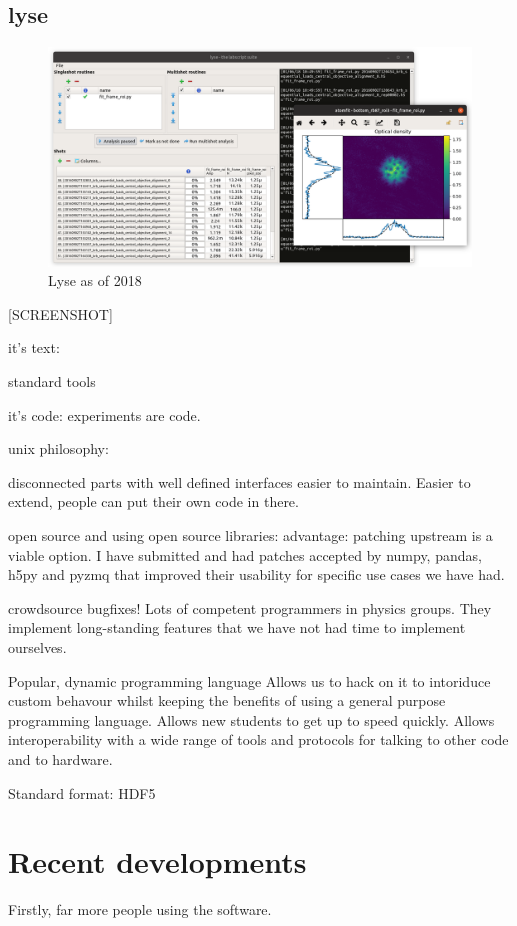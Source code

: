\subsection{lyse}
\begin{figure}
\begin{center}
\includegraphics[width=\textwidth]{figures/software/new_screenshots/lyse.png}
\caption{Lyse as of 2018}\label{fig:lyse}
\end{center}
\end{figure}
[SCREENSHOT]

it's text:

standard tools

it's code: experiments are code.

unix philosophy:

disconnected parts with well defined interfaces easier to maintain. Easier to extend, people can put their own code in there.

open source and using open source libraries: advantage: patching upstream is a viable option. I have submitted and had patches accepted by numpy, pandas, h5py and pyzmq that improved their usability for specific use cases we have had. 

crowdsource bugfixes! Lots of competent programmers in physics groups. They implement long-standing features
that we have not had time to implement ourselves.

Popular, dynamic programming language
Allows us to hack on it to intoriduce custom behavour whilst keeping the benefits of using a general purpose programming language. Allows new students to get up to speed quickly. Allows interoperability with a wide range of tools and protocols for talking to other code and to hardware.

Standard format: HDF5


\section{Recent developments}
Firstly, far more people using the software.

